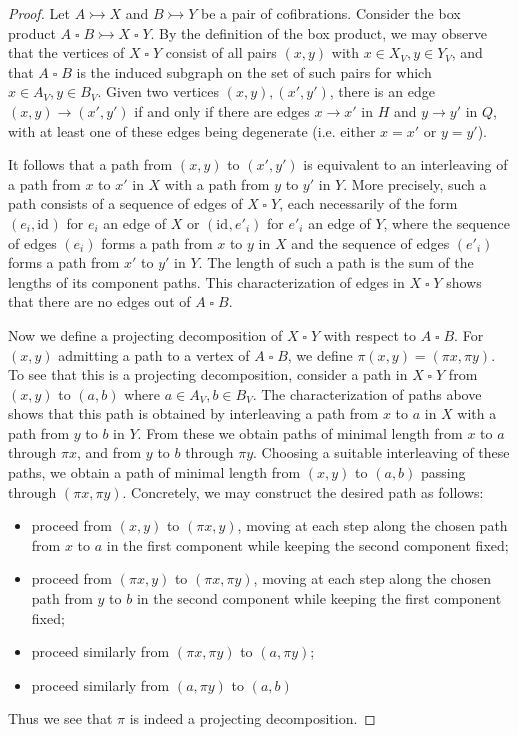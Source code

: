 \documentclass[11pt]{article}
\theoremstyle{definition}
\numberwithin{equation}{section}
\newcommand{\id}[1][]{\mathrm{id}_{#1}}
\newcommand{\gtimes}{\mathbin{\square}}
\newcommand{\cto}{\rightarrowtail}
\begin{document}
\begin{proof}
Let $A \cto X$ and $B \cto Y$ be a pair of cofibrations. Consider the box product $A \gtimes B \cto X \gtimes Y$. By the definition of the box product, we may observe that the vertices of $X \gtimes Y$ consist of all pairs $(x,y)$ with $x \in X_V, y \in Y_V$, and that $A \gtimes B$ is the induced subgraph on the set of such pairs for which $x \in A_V, y \in B_V$. Given two vertices $(x,y), (x',y')$, there is an edge $(x,y) \to (x',y')$ if and only if there are edges $x \to x'$ in $H$ and $y \to y'$ in $Q$, with at least one of these edges being degenerate (i.e.  either $x = x'$ or $y = y'$). 

It follows that a path from $(x,y)$ to $(x',y')$ is equivalent to an interleaving of a path from $x$ to $x'$ in $X$ with a path from $y$ to $y'$ in $Y$. More precisely, such a path consists of a sequence of edges of $X \gtimes Y$, each necessarily of the form $(e_i,\id)$ for $e_i$ an edge of $X$ or $(\id,e'_i)$ for $e'_i$ an edge of $Y$, where the sequence of edges $(e_i)$ forms a path from $x$ to $y$ in $X$ and the sequence of edges $(e'_i)$ forms a path from $x'$ to $y'$ in $Y$. The length of such a path is the sum of the lengths of its component paths. This characterization of edges in $X \gtimes Y$ shows that there are no edges out of $A \gtimes B$.

Now we define a projecting decomposition of $X \gtimes Y$ with respect to $A \gtimes B$. For $(x,y)$ admitting a path to a vertex of $A \gtimes B$, we define $\pi(x,y) = (\pi x, \pi y)$. To see that this is a projecting decomposition, consider a path in $X \gtimes Y$ from $(x,y)$ to $(a,b)$ where $a \in A_V, b \in B_V$. The characterization of paths above shows that this path is obtained by interleaving a path from $x$ to $a$ in $X$ with a path from $y$ to $b$ in $Y$. From these we obtain paths of minimal length from $x$ to $a$ through $\pi x$, and from $y$ to $b$ through $\pi y$. Choosing a suitable interleaving of these paths, we obtain a path of minimal length from $(x,y)$ to $(a,b)$ passing through $(\pi x, \pi y)$. Concretely, we may construct the desired path as follows:
\begin{itemize}
    \item proceed from $(x,y)$ to $(\pi x, y)$, moving at each step along the chosen path from $x$ to $a$ in the first component while keeping the second component fixed;
    \item proceed from $(\pi x, y)$ to $(\pi x, \pi y)$, moving at each step along the chosen path from $y$ to $b$ in the second component while keeping the first component fixed;
    \item proceed similarly from $(\pi x, \pi y)$ to $(a, \pi y)$;
    \item proceed similarly from $(a,\pi y)$ to $(a,b)$
\end{itemize}
Thus we see that $\pi$ is indeed a projecting decomposition.
\end{proof}
\end{document}
